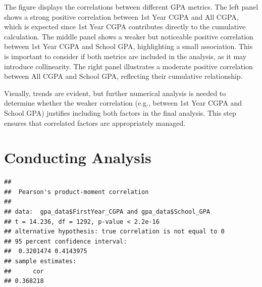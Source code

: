\documentclass[
  12pt,
]{article}
\newenvironment{Shaded}{\begin{snugshade}}{\end{snugshade}}
\newcommand{\AttributeTok}[1]{\textcolor[rgb]{0.13,0.29,0.53}{#1}}
\newcommand{\CommentTok}[1]{\textcolor[rgb]{0.56,0.35,0.01}{\textit{#1}}}
\newcommand{\FunctionTok}[1]{\textcolor[rgb]{0.13,0.29,0.53}{\textbf{#1}}}
\newcommand{\NormalTok}[1]{#1}
\newcommand{\OtherTok}[1]{\textcolor[rgb]{0.56,0.35,0.01}{#1}}
\newcommand{\SpecialCharTok}[1]{\textcolor[rgb]{0.81,0.36,0.00}{\textbf{#1}}}
\newcommand{\StringTok}[1]{\textcolor[rgb]{0.31,0.60,0.02}{#1}}
\begin{document}
The figure displays the correlations between different GPA metrics. The
left panel shows a strong positive correlation between 1st Year CGPA and
All CGPA, which is expected since 1st Year CGPA contributes directly to
the cumulative calculation. The middle panel shows a weaker but
noticeable positive correlation between 1st Year CGPA and School GPA,
highlighting a small association. This is important to consider if both
metrics are included in the analysis, as it may introduce collinearity.
The right panel illustrates a moderate positive correlation between All
CGPA and School GPA, reflecting their cumulative relationship.

Visually, trends are evident, but further numerical analysis is needed
to determine whether the weaker correlation (e.g., between 1st Year CGPA
and School GPA) justifies including both factors in the final analysis.
This step ensures that correlated factors are appropriately managed.

\newpage

\section{Conducting Analysis}\label{conducting-analysis}

\begin{Shaded}
\end{Shaded}

\begin{verbatim}
## 
##  Pearson's product-moment correlation
## 
## data:  gpa_data$FirstYear_CGPA and gpa_data$School_GPA
## t = 14.236, df = 1292, p-value < 2.2e-16
## alternative hypothesis: true correlation is not equal to 0
## 95 percent confidence interval:
##  0.3201474 0.4143975
## sample estimates:
##      cor 
## 0.368218
\end{verbatim}

\begin{Shaded}
\end{Shaded}
\end{document}

